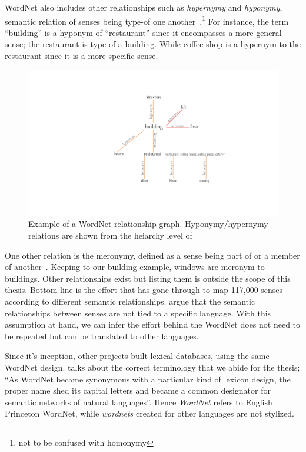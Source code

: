 WordNet also includes other relationships such as \emph{hypernymy} and \emph{hyponymy}, semantic relation of senses being type-of one another~\cite{miller_nouns_1990}.\footnote{not to be confused with homonymy}
For instance, the term \enquote{building} is a hyponym of \enquote{restaurant} since it encompasses a more general sense; the restaurant is type of a building.
While coffee shop is a hypernym to the restaurant since it is a more specific sense.

\begin{figure}[htbp]
    \centering
    \includegraphics[page=1,width=\textwidth]{Figures/hyponym_hypernym.pdf}
    \caption{Example of a WordNet relationship graph. Hyponymy/hypernymy relations are shown from the heiarchy level of }%
    \label{fig:hyponymy}
\end{figure}

One other relation is the meronymy, defined as a sense being part of or a member of another~\cite{winston_taxonomy_1987}.
Keeping to our building example, windows are meronym to buildings.
Other relationships exist but listing them is outside the scope of this thesis.
Bottom line is the effort that has gone through to map 117,000 senses according to different semantic relationships.
\textcite{sagot_building_2008} argue that the semantic relationships between senses are not tied to a specific language.
With this assumption at hand, we can infer the effort behind the WordNet does not need to be repeated but can be translated to other languages.

Since it's inception, other projects built lexical databases, using the same WordNet design.
\textcite{fellbaum_semantic_1998} talks about the correct terminology that we abide for the thesis; \enquote{As WordNet became synonymous with a particular kind of lexicon design, the proper name shed its capital letters and became a common designator for semantic networks of natural languages}.
Hence \emph{WordNet} refers to English Princeton WordNet, while \emph{wordnets} created for other languages are not stylized.

